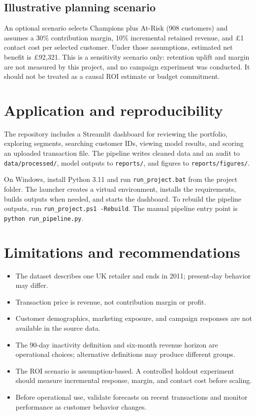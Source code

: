 \documentclass[11pt,a4paper]{article}
\newcommand{\GBP}{\pounds}
\begin{document}
\subsection{Illustrative planning scenario}

An optional scenario selects Champions plus At-Risk (908 customers) and assumes
a 30\% contribution margin, 10\% incremental retained revenue, and \GBP 1
contact cost per selected customer. Under those assumptions, estimated net
benefit is \GBP 92,321. This is a sensitivity scenario only: retention uplift
and margin are not measured by this project, and no campaign experiment was
conducted. It should not be treated as a causal ROI estimate or budget
commitment.

\section{Application and reproducibility}

The repository includes a Streamlit dashboard for reviewing the portfolio,
exploring segments, searching customer IDs, viewing model results, and scoring
an uploaded transaction file. The pipeline writes cleaned data and an audit
to \texttt{data/processed/}, model outputs to \texttt{reports/}, and figures to
\texttt{reports/figures/}.

On Windows, install Python 3.11 and run \texttt{run\_project.bat} from the
project folder. The launcher creates a virtual environment, installs the
requirements, builds outputs when needed, and starts the dashboard. To rebuild
the pipeline outputs, run \texttt{run\_project.ps1 -Rebuild}. The manual
pipeline entry point is \texttt{python run\_pipeline.py}.

\section{Limitations and recommendations}

\begin{itemize}
  \item The dataset describes one UK retailer and ends in 2011; present-day
  behavior may differ.
  \item Transaction price is revenue, not contribution margin or profit.
  \item Customer demographics, marketing exposure, and campaign responses are
  not available in the source data.
  \item The 90-day inactivity definition and six-month revenue horizon are
  operational choices; alternative definitions may produce different groups.
  \item The ROI scenario is assumption-based. A controlled holdout experiment
  should measure incremental response, margin, and contact cost before scaling.
  \item Before operational use, validate forecasts on recent transactions and
  monitor performance as customer behavior changes.
\end{itemize}
\end{document}
